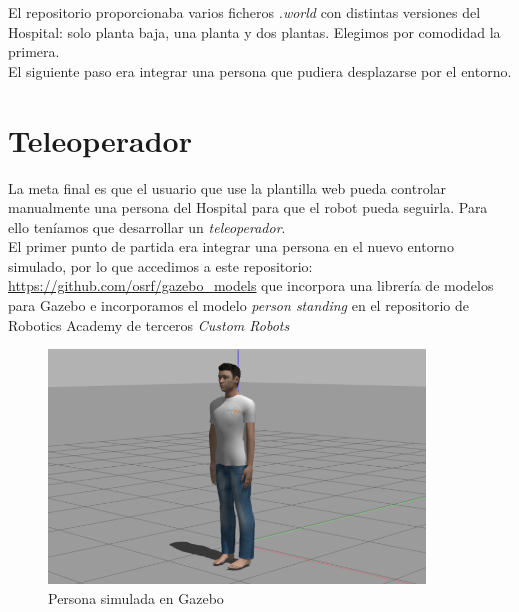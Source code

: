 El repositorio proporcionaba varios ficheros \textit{.world} con distintas versiones del Hospital: solo planta baja, una planta y dos plantas. Elegimos por comodidad la primera.\\

El siguiente paso era integrar una persona que pudiera desplazarse por el entorno.\\



\section{Teleoperador}
\label{sec:teleoperador}

La meta final es que el usuario que use la plantilla web pueda controlar manualmente una persona del Hospital para que el robot pueda seguirla. Para ello teníamos que desarrollar un \textit{teleoperador}.\\

El primer punto de partida era integrar una persona en el nuevo entorno simulado, por lo que accedimos a este repositorio: \url{https://github.com/osrf/gazebo_models} que incorpora una librería de modelos para Gazebo e incorporamos el modelo \textit{person standing} en el repositorio de Robotics Academy de terceros \textit{Custom Robots}\\

\begin{figure} [H]
  \begin{center}
    \includegraphics[width=10cm]{imagenes/person_model.png}
  \end{center}
  \caption[Persona simulada en Gazebo]{Persona simulada en Gazebo}
  \label{fig:persona_gazebo}
\end{figure}\

